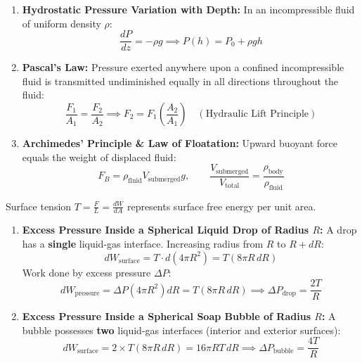 \documentclass[10pt,twoside,openright]{book}
\begin{document}
\begin{conceptbox}
\begin{enumerate}[leftmargin=*]
  \item \textbf{Hydrostatic Pressure Variation with Depth:} In an incompressible fluid of uniform density $\rho$:
  \begin{equation}
    \frac{dP}{dz} = -\rho g \implies P(h) = P_0 + \rho g h
  \end{equation}
  \item \textbf{Pascal's Law:} Pressure exerted anywhere upon a confined incompressible fluid is transmitted undiminished equally in all directions throughout the fluid:
  \begin{equation}
    \frac{F_1}{A_1} = \frac{F_2}{A_2} \implies F_2 = F_1\left(\frac{A_2}{A_1}\right) \quad (\text{Hydraulic Lift Principle})
  \end{equation}
  \item \textbf{Archimedes' Principle \& Law of Floatation:} Upward buoyant force equals the weight of displaced fluid:
  \begin{equation}
    F_B = \rho_{\text{fluid}} V_{\text{submerged}} g, \qquad \frac{V_{\text{submerged}}}{V_{\text{total}}} = \frac{\rho_{\text{body}}}{\rho_{\text{fluid}}}
  \end{equation}
\end{enumerate}
\end{conceptbox}

\begin{formulabox}
Surface tension $T = \frac{F}{L} = \frac{dW}{dA}$ represents surface free energy per unit area.
\begin{enumerate}[leftmargin=*]
  \item \textbf{Excess Pressure Inside a Spherical Liquid Drop of Radius $R$:}
  A drop has a \textbf{single} liquid-gas interface. Increasing radius from $R$ to $R+dR$:
  \begin{equation}
    dW_{\text{surface}} = T \cdot d(4\pi R^2) = T(8\pi R\,dR)
  \end{equation}
  Work done by excess pressure $\Delta P$:
  \begin{equation}
    dW_{\text{pressure}} = \Delta P(4\pi R^2)dR = T(8\pi R\,dR) \implies \Delta P_{\text{drop}} = \frac{2T}{R}
  \end{equation}
  \item \textbf{Excess Pressure Inside a Spherical Soap Bubble of Radius $R$:}
  A bubble possesses \textbf{two} liquid-gas interfaces (interior and exterior surfaces):
  \begin{equation}
    dW_{\text{surface}} = 2 \times T(8\pi R\,dR) = 16\pi R T\,dR \implies \Delta P_{\text{bubble}} = \frac{4T}{R}
  \end{equation}
\end{enumerate}
\end{formulabox}
\end{document}
